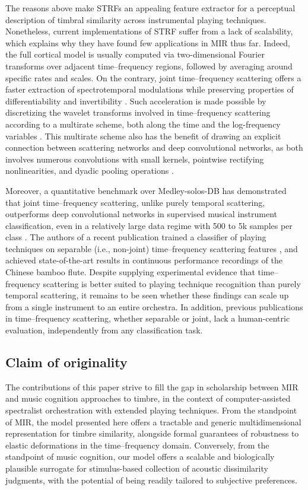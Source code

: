 \documentclass{bmcart}
\makeatletter
\newcommand*{\ie}{i.e.,\@\xspace}
\makeatother
\begin{document}
The reasons above make STRFs an appealing feature extractor for a perceptual description of timbral similarity across instrumental playing techniques.
Nonetheless, current implementations of STRF suffer from a lack of scalability, which explains why they have found few applications in MIR thus far.
Indeed, the full cortical model is usually computed via two-dimensional Fourier transforms over adjacent time--frequency regions, followed by averaging around specific rates and scales.
On the contrary, joint time--frequency scattering offers a faster extraction of spectrotemporal modulations while preserving properties of differentiability \cite{andreux2019jmlr} and invertibility \cite{lostanlen2019dafx}.
Such acceleration is made possible by discretizing the wavelet transforms involved in time--frequency scattering according to a multirate scheme, both along the time and the log-frequency variables \cite{anden2019tsp}.
This multirate scheme also has the benefit of drawing an explicit connection between scattering networks and deep convolutional networks, as both involves numerous convolutions with small kernels, pointwise rectifying nonlinearities, and dyadic pooling operations \cite{mallat2016philtrans}.

Moreover, a quantitative benchmark over Medley-solos-DB has demonstrated that joint time--frequency scattering, unlike purely temporal scattering, outperforms deep convolutional networks in supervised musical instrument classification, even in a relatively large data regime with 500 to 5k samples per class \cite{anden2019tsp}.
The authors of a recent publication \cite{wang2019ismir} trained a classifier of playing techniques on separable (\ie{} non-joint) time--frequency scattering features \cite{anden2014tsp}, and achieved state-of-the-art results in continuous performance recordings of the Chinese bamboo flute. 
Despite supplying experimental evidence that time--frequency scattering is better suited to playing technique recognition than purely temporal scattering, it remains to be seen whether these findings can scale up from a single instrument to an entire orchestra.
In addition, previous publications in time--frequency scattering, whether separable or joint, lack a human-centric evaluation, independently from any classification task.

\subsection*{Claim of originality}
The contributions of this paper strive to fill the gap in scholarship between MIR and music cognition approaches to timbre, in the context of computer-assisted spectralist orchestration with extended playing techniques.
From the standpoint of MIR, the model presented here offers a tractable and generic multidimensional representation for timbre similarity, alongside formal guarantees of robustness to elastic deformations in the time--frequency domain.
Conversely, from the standpoint of music cognition, our model offers a scalable and biologically plausible surrogate for stimulus-based collection of acoustic dissimilarity judgments, with the potential of being readily tailored to subjective preferences.
\end{document}
